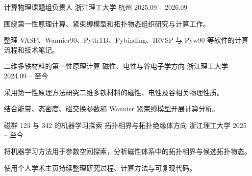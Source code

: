 
\begin{cventries}
  \cventry
    {计算物理课题组负责人}
    {浙江理工大学}
    {杭州}
    {2025.09 -- 2026.09}
    {
      \begin{cvitems}
        \item {围绕第一性原理计算、紧束缚模型和拓扑物态组织研究与计算工作。}
        \item {整理 VASP、Wannier90、PythTB、Pybinding、IRVSP 与 Pyw90 等软件的计算流程和技术笔记。}
      \end{cvitems}
    }

  \cventry
    {二维多铁材料的第一性原理计算}
    {磁性、电性与谷电子学方向}
    {浙江理工大学}
    {2024.09 -- 至今}
    {
      \begin{cvitems}
        \item {采用第一性原理方法研究二维多铁材料的磁性、电性及谷相关物理性质。}
        \item {结合能带、态密度、磁交换参数和 Wannier 紧束缚模型开展计算分析。}
      \end{cvitems}
    }

  \cventry
    {磁群 123 与 342 的机器学习探索}
    {拓扑相界与拓扑绝缘体方向}
    {浙江理工大学}
    {2025 -- 至今}
    {
      \begin{cvitems}
        \item {将机器学习方法用于参数空间探索，分析磁性体系中的拓扑相界与候选拓扑物态。}
        \item {使用个人学术主页持续整理研究过程、计算方法与可复现代码。}
      \end{cvitems}
    }
\end{cventries}
